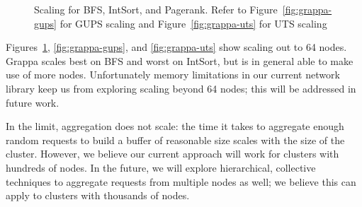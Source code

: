 \begin{figure}[ht]
    \begin{center}
      \qquad
      \qquad
      \qquad
    \end{center}
    \caption{Scaling for BFS, IntSort, and Pagerank. Refer to Figure~\ref{fig:grappa-gups} for GUPS scaling and Figure~\ref{fig:grappa-uts} for UTS scaling}
    \label{fig:grappa-scaling}
\end{figure}

Figures~\ref{fig:grappa-scaling}, \ref{fig:grappa-gups}, and
\ref{fig:grappa-uts} show scaling out to 64 nodes. Grappa scales best
on BFS and worst on IntSort, but is in general able to make use of
more nodes. Unfortunately memory limitations in our current network
library keep us from exploring scaling beyond 64 nodes; this will be
addressed in future work.

In the limit, aggregation does not scale: the time it takes to
aggregate enough random requests to build a buffer of reasonable size
scales with the size of the cluster. However, we believe our current
approach will work for clusters with hundreds of nodes. In the future,
we will explore hierarchical, collective techniques to aggregate
requests from multiple nodes as well; we believe this can apply to
clusters with thousands of nodes.

